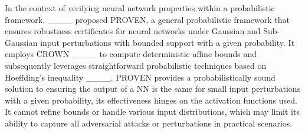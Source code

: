 \begin{comment}
\efi{Is this local robustness really relevant to our paper? Seems to me it's about "deterministic" robustness.} The local robustness property in classification problems can be formulated as follows.
A neural network $f$ is locally robust at $x_{0}$  if
\begin{align*}
\forall x: \parallel x - x_{0}\parallel \leq \epsilon \xrightarrow[]{} f(x) = f(x_{0})
\end{align*}
 for some positive $\epsilon$ ($\epsilon$-robust),   where $\parallel \cdot \parallel$ is some distance measure. 
It is typical to consider $l_{1}$, $l_{2}$ or $l_{\infty}$ norms as distance measures, with the latter %
being the most popular.

Interval Bound Propagation (IBP) ____ provides certified robustness against \textit{nonrandom} adversarial perturbations by deriving constant-type bounds for output neurons based on input ranges. Linear Relaxation Perturbation Analysis (LiRPA) ____ generalizes bounds computation using a graph-based approach, expressing neural networks as computational graphs to construct affine bounds for intermediate nodes. CROWN and CROWN-IBP ____ certify robustness for neural networks with general activation functions. CROWN bounds non-piecewise-linear activations using linear and quadratic functions, while CROWN-IBP combines IBP's efficiency with CROWN's tighter linear relaxation bounds.  GenBaB ____ extends branch-and-bound (BaB) frameworks ____ to verify neural networks with general nonlinearities by combining linear bound propagation and optimized branching strategies, supporting activations like Sigmoid, Tanh, GeLU, and multidimensional operations. Finally, SMT-based frameworks like Reluplex ____ and Marabou ____ verify neural networks by transforming property queries into constraint satisfaction problems, handling diverse activation functions and topologies with parallel execution for scalability.
\end{comment}


In the context of verifying neural network properties within a probabilistic framework,  ____ proposed PROVEN, a general probabilistic framework that ensures robustness certificates for neural networks under Gaussian and Sub-Gaussian input perturbations with bounded support with a given probability. It employs CROWN ____ to compute deterministic affine bounds and subsequently leverages straightforward probabilistic techniques based on Hoeffding's inequality ____.  PROVEN provides a probabilistically sound solution to ensuring the output of a NN is the same for small input perturbations with a given probability, its effectiveness hinges on the activation functions used. It cannot refine bounds or handle various input distributions, which may limit its ability to capture all adversarial attacks or perturbations in practical scenarios.

